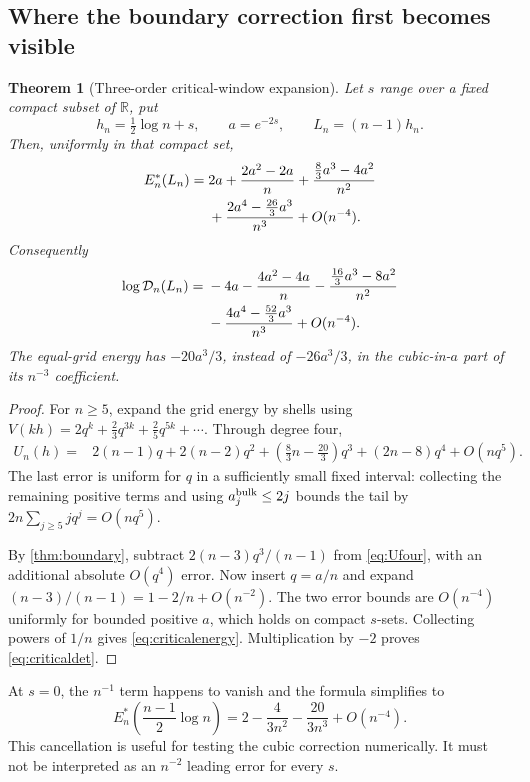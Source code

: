 \documentclass[11pt,a4paper]{article}
\newtheorem{theorem}{Theorem}[section]
\theoremstyle{definition}
\theoremstyle{remark}
\newcommand{\R}{\mathbb R}
\newcommand{\Dopt}{\mathcal D}
\begin{document}
\subsection{Where the boundary correction first becomes visible}
\begin{theorem}[Three-order critical-window expansion]
\label{thm:critical}
Let $s$ range over a fixed compact subset of $\R$, put
\begin{equation}
 h_n=\tfrac12\log n+s,\qquad a=e^{-2s},\qquad L_n=(n-1)h_n.
 \label{eq:criticalwindow}
\end{equation}
Then, uniformly in that compact set,
\begin{align}
 E_n^*(L_n)
 ={}&2a+\frac{2a^2-2a}{n}
 +\frac{\frac83a^3-4a^2}{n^2}\notag\\
 &+\frac{2a^4-\frac{26}{3}a^3}{n^3}+O(n^{-4}).
 \label{eq:criticalenergy}
\end{align}
Consequently
\begin{align}
 \log\Dopt_n(L_n)
 ={}&-4a-\frac{4a^2-4a}{n}
 -\frac{\frac{16}{3}a^3-8a^2}{n^2}\notag\\
 &-\frac{4a^4-\frac{52}{3}a^3}{n^3}+O(n^{-4}).
 \label{eq:criticaldet}
\end{align}
The equal-grid energy has $-20a^3/3$, instead of $-26a^3/3$, in the
cubic-in-$a$ part of its $n^{-3}$ coefficient.
\end{theorem}
\begin{proof}
For $n\ge5$, expand the grid energy by shells using
$V(kh)=2q^k+\frac23q^{3k}+\frac25q^{5k}+\cdots$. Through degree four,
\begin{align}
 U_n(h)={}&2(n-1)q+2(n-2)q^2
 +\left(\frac83n-\frac{20}3\right)q^3
 +(2n-8)q^4+O(nq^5).
 \label{eq:Ufour}
\end{align}
The last error is uniform for $q$ in a sufficiently small fixed interval:
collecting the remaining positive terms and using
$a_j^{\rm bulk}\le2j$ bounds the tail by
$2n\sum_{j\ge5}jq^j=O(nq^5)$.

By \cref{thm:boundary}, subtract
$2(n-3)q^3/(n-1)$ from \eqref{eq:Ufour}, with an additional absolute
$O(q^4)$ error. Now insert $q=a/n$ and expand
$(n-3)/(n-1)=1-2/n+O(n^{-2})$.
The two error bounds are $O(n^{-4})$ uniformly for bounded positive $a$,
which holds on compact $s$-sets. Collecting powers of $1/n$ gives
\eqref{eq:criticalenergy}. Multiplication by $-2$ proves
\eqref{eq:criticaldet}.
\end{proof}

At $s=0$, the $n^{-1}$ term happens to vanish and the formula simplifies to
\begin{equation}
 E_n^*\!\left(\frac{n-1}{2}\log n\right)
 =2-\frac4{3n^2}-\frac{20}{3n^3}+O(n^{-4}).
 \label{eq:criticalzero}
\end{equation}
This cancellation is useful for testing the cubic correction numerically.
It must not be interpreted as an $n^{-2}$ leading error for every $s$.
\end{document}
